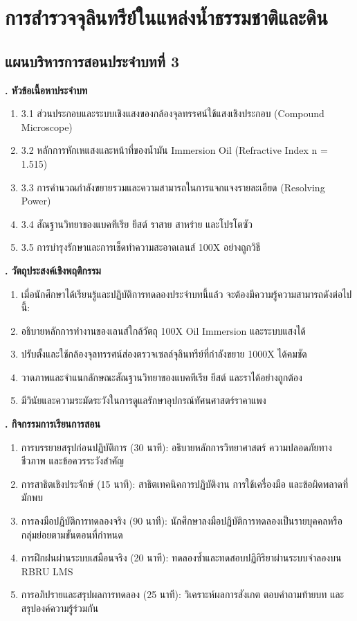 \chapter{การสำรวจจุลินทรีย์ในแหล่งน้ำธรรมชาติและดิน}
\label{chap:ch03}

\section*{แผนบริหารการสอนประจำบทที่ 3}

\noindent\textbf{. หัวข้อเนื้อหาประจำบท}

\begin{enumerate}
    \item 3.1 ส่วนประกอบและระบบเชิงแสงของกล้องจุลทรรศน์ใช้แสงเชิงประกอบ (Compound Microscope)
    \item 3.2 หลักการหักเหแสงและหน้าที่ของน้ำมัน Immersion Oil (Refractive Index n = 1.515)
    \item 3.3 การคำนวณกำลังขยายรวมและความสามารถในการแจกแจงรายละเอียด (Resolving Power)
    \item 3.4 สัณฐานวิทยาของแบคทีเรีย ยีสต์ ราสาย สาหร่าย และโปรโตซัว
    \item 3.5 การบำรุงรักษาและการเช็ดทำความสะอาดเลนส์ 100X อย่างถูกวิธี
\end{enumerate}

\noindent\textbf{. วัตถุประสงค์เชิงพฤติกรรม}

\begin{enumerate}
    \item เมื่อนักศึกษาได้เรียนรู้และปฏิบัติการทดลองประจำบทนี้แล้ว จะต้องมีความรู้ความสามารถดังต่อไปนี้:
    \item อธิบายหลักการทำงานของเลนส์ใกล้วัตถุ 100X Oil Immersion และระบบแสงได้
    \item ปรับตั้งและใช้กล้องจุลทรรศน์ส่องตรวจเซลล์จุลินทรีย์ที่กำลังขยาย 1000X ได้คมชัด
    \item วาดภาพและจำแนกลักษณะสัณฐานวิทยาของแบคทีเรีย ยีสต์ และราได้อย่างถูกต้อง
    \item มีวินัยและความระมัดระวังในการดูแลรักษาอุปกรณ์ทัศนศาสตร์ราคาแพง
\end{enumerate}

\noindent\textbf{. กิจกรรมการเรียนการสอน}

\begin{enumerate}
    \item การบรรยายสรุปก่อนปฏิบัติการ (30 นาที): อธิบายหลักการวิทยาศาสตร์ ความปลอดภัยทางชีวภาพ และข้อควรระวังสำคัญ
    \item การสาธิตเชิงประจักษ์ (15 นาที): สาธิตเทคนิคการปฏิบัติงาน การใช้เครื่องมือ และข้อผิดพลาดที่มักพบ
    \item การลงมือปฏิบัติการทดลองจริง (90 นาที): นักศึกษาลงมือปฏิบัติการทดลองเป็นรายบุคคลหรือกลุ่มย่อยตามขั้นตอนที่กำหนด
    \item การฝึกฝนผ่านระบบเสมือนจริง (20 นาที): ทดลองซ้ำและทดสอบปฏิกิริยาผ่านระบบจำลองบน RBRU LMS
    \item การอภิปรายและสรุปผลการทดลอง (25 นาที): วิเคราะห์ผลการสังเกต ตอบคำถามท้ายบท และสรุปองค์ความรู้ร่วมกัน
\end{enumerate}


